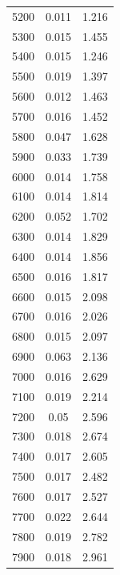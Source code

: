 \documentclass{article}
\begin{document}
\begin{longtable}{c|c|c}
             5200 &        0.011 &           1.216 \\
             5300 &        0.015 &           1.455 \\
             5400 &        0.015 &           1.246 \\
             5500 &        0.019 &           1.397 \\
             5600 &        0.012 &           1.463 \\
             5700 &        0.016 &           1.452 \\
             5800 &        0.047 &           1.628 \\
             5900 &        0.033 &           1.739 \\
             6000 &        0.014 &           1.758 \\
             6100 &        0.014 &           1.814 \\
             6200 &        0.052 &           1.702 \\
             6300 &        0.014 &           1.829 \\
             6400 &        0.014 &           1.856 \\
             6500 &        0.016 &           1.817 \\
             6600 &        0.015 &           2.098 \\
             6700 &        0.016 &           2.026 \\
             6800 &        0.015 &           2.097 \\
             6900 &        0.063 &           2.136 \\
             7000 &        0.016 &           2.629 \\
             7100 &        0.019 &           2.214 \\
             7200 &        0.05  &           2.596 \\
             7300 &        0.018 &           2.674 \\
             7400 &        0.017 &           2.605 \\
             7500 &        0.017 &           2.482 \\
             7600 &        0.017 &           2.527 \\
             7700 &        0.022 &           2.644 \\
             7800 &        0.019 &           2.782 \\
             7900 &        0.018 &           2.961 \\

\end{longtable}
\end{document}
